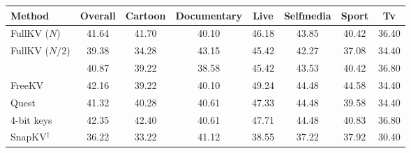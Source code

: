 \begin{tabular}{l|ccccccc}
\toprule
\textbf{Method} & Overall & Cartoon & Documentary & Live & Selfmedia & Sport & Tv \\
\midrule
FullKV ($N$) & 41.64 & 41.70 & 40.10 & 46.18 & 43.85 & 40.42 & 36.40 \\
FullKV ($N/2$) & 39.38 & 34.28 & 43.15 & 45.42 & 42.27 & 37.08 & 34.40 \\
\midrule
\method{} & 40.87 & 39.22 & 38.58 & 45.42 & 43.53 & 40.42 & 36.80 \\
FreeKV & 42.16 & 39.22 & 40.10 & 49.24 & 44.48 & 44.58 & 34.40 \\
Quest & 41.32 & 40.28 & 40.61 & 47.33 & 44.48 & 39.58 & 34.40 \\
4-bit keys & 42.35 & 42.40 & 40.61 & 47.71 & 44.48 & 40.83 & 36.80 \\
SnapKV$^\dagger$ & 36.22 & 33.22 & 41.12 & 38.55 & 37.22 & 37.92 & 30.40 \\
\bottomrule
\end{tabular}
